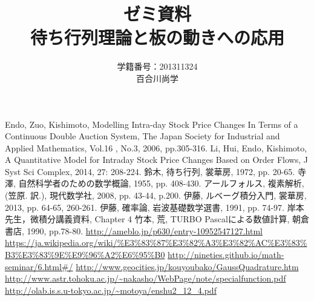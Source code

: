 \documentclass[a4j,papersize,disablejfam,slide,14pt]{jsarticle}
\begin{document}
\title{\Huge ゼミ資料\\待ち行列理論と板の動きへの応用}
\author{\Large 学籍番号：201311324\\百合川尚学}
\maketitle

\tableofcontents

\begin{thebibliography}{9}
         {\rm Endo, Zuo, Kishimoto, 
        Modelling Intra-day Stock Price Changes In Terms of
        a Continuous Double Auction System, 
        The Japan Society for Industrial and Applied Mathematics, 
        Vol.16 , No.3, 2006, pp.305-316.}
         {\rm Li, Hui, Endo, Kishimoto, A Quantitative Model for Intraday Stock Price
         Changes Based on Order Flows, 
         J Syst Sci Complex, 2014, 27: 208-224.}
         {\rm 鈴木, 待ち行列, 裳華房, 1972, pp. 20-65.}
         {\rm 寺澤, 自然科学者のための数学概論, 1955, pp. 408-430.}
         {\rm アールフォルス, 複素解析, (笠原. 訳.), 現代数学社, 2008, pp. 43-44, p.200.}
         {\rm 伊藤, ルベーグ積分入門, 裳華房, 2013, pp. 64-65, 260-261.}
         {\rm 伊藤, 確率論, 岩波基礎数学選書, 1991, pp. 74-97.}
         {\rm 岸本先生，微積分講義資料, Chapter 4}
         {\rm 竹本, 荒, TURBO Pascalによる数値計算, 朝倉書店, 1990, pp.78-80.}
         \url{http://ameblo.jp/p630/entry-10952547127.html}
         \url{https://ja.wikipedia.org/wiki/\%E3\%83\%87\%E3\%82\%A3\%E3\%82\%AC\%E3\%83\%B3\%E3\%83\%9E\%E9\%96\%A2\%E6\%95\%B0}
         \url{http://nineties.github.io/math-seminar/6.html#/}
         \url{http://www.geocities.jp/kouyoubako/GaussQuadrature.htm}
         \url{http://www.astr.tohoku.ac.jp/~nakasho/WebPage/note/specialfunction.pdf}
         \url{http://olab.is.s.u-tokyo.ac.jp/~motoya/enshu2_12_4.pdf}
        
\end{thebibliography}
\end{document}
